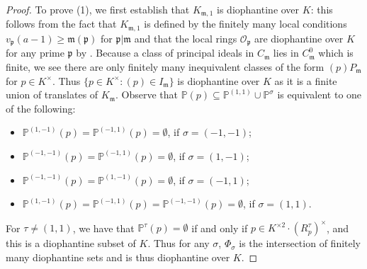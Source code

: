 \documentclass[12pt,reqno]{amsart}
\newcommand{\mm}{\mathfrak{m}}
\newcommand{\OO}{\mathcal{O}}
\newcommand{\pp}{\mathfrak{p}}
\newcommand{\PP}{\mathbb{P}}
\theoremstyle{definition}
\begin{document}
\begin{proof}
 To prove (1), we first establish that $K_{\mm,1}$ is
  diophantine over $K$: this follows from the fact that $K_{\mm,1}$ is defined
  by the finitely many local conditions $v_{\pp}(a-1)\geq
  \mm(\pp)$ for $\pp|\mm$ and that the local rings $\OO_{\pp}$ are
  diophantine over $K$ for any prime $\pp$ by \cite[Lemma 3.22]{Shl94}. 
  Because a class of principal ideals in $C_{\mm}$ lies in $C^0_{\mm}$ which is
  finite, we see there are only finitely many inequivalent classes of
  the form $(p)P_{\mm}$ for $p\in K^{\times}$. Thus $\{p\in
  K^{\times}: (p)\in I_{\mm}\}$ is diophantine over $K$ as it is a finite union
  of translates of $K_{\mm}$.  Observe that $\PP(p)\subseteq
  \PP^{(1,1)}\cup \PP^{\sigma}$ is equivalent to one of the following:
  \begin{itemize}
  \item $\PP^{(1,-1)}(p)=\PP^{(-1,1)}(p)=\emptyset$, if $\sigma=(-1,-1)$;
  \item $\PP^{(-1,-1)}(p)=\PP^{(-1,1)}(p)=\emptyset$, if $\sigma=(1,-1)$;
  \item $\PP^{(-1,-1)}(p)=\PP^{(1,-1)}(p)=\emptyset$, if $\sigma=(-1,1)$;
  \item $\PP^{(1,-1)}(p)=\PP^{(-1,1)}(p)=\PP^{(-1,-1)}(p)=\emptyset$, if $\sigma=(1,1)$.
  \end{itemize}
  
  For $\tau\not=(1,1)$, we
  have that $\PP^{\tau}(p)=\emptyset$ if and only if $p\in
  K^{\times2}\cdot (R_p^{\tau})^{\times}$, and this is a diophantine
  subset of $K$. Thus for any $\sigma$, $\Phi_{\sigma}$ is the
  intersection of finitely many diophantine sets and is thus
  diophantine over $K$.



\end{proof}
\end{document}
